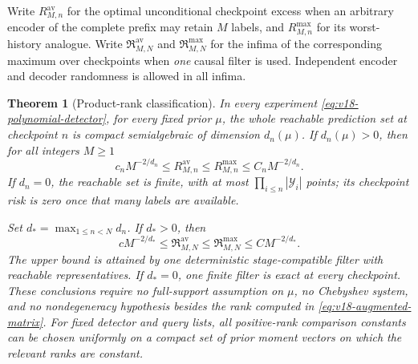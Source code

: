 \documentclass[11pt]{amsart}
\newtheorem{theorem}{Theorem}[section]
\theoremstyle{definition}\newtheorem{definition}[theorem]{Definition}
\theoremstyle{remark}\newtheorem{remark}[theorem]{Remark}
\begin{document}
Write $R^{\mathrm{av}}_{M,n}$ for the optimal unconditional checkpoint
excess when an arbitrary encoder of the complete prefix may retain
$M$ labels, and $R^{\mathrm{max}}_{M,n}$ for its worst-history analogue.
Write $\mathfrak R^{\mathrm{av}}_{M,N}$ and
$\mathfrak R^{\mathrm{max}}_{M,N}$ for the infima of the corresponding
maximum over checkpoints when \emph{one} causal filter is used.
Independent encoder and decoder randomness is allowed in all infima.

\begin{theorem}[Product-rank classification]\label{thm:v18-rank-classification}
In every experiment \eqref{eq:v18-polynomial-detector}, for every fixed
prior $\mu$, the whole reachable prediction set at checkpoint $n$ is
compact semialgebraic of dimension $d_n(\mu)$. If $d_n(\mu)>0$, then
for all integers $M\ge1$
\begin{equation}\label{eq:v18-checkpoint-rank-law}
 c_nM^{-2/d_n}\le R^{\mathrm{av}}_{M,n}
 \le R^{\mathrm{max}}_{M,n}\le C_nM^{-2/d_n}.
\end{equation}
If $d_n=0$, the reachable set is finite, with at most
$\prod_{i\le n}|\mathcal Y_i|$ points; its checkpoint risk is zero once
that many labels are available.

Set $d_* =\max_{1\le n<N}d_n$. If $d_*>0$, then
\begin{equation}\label{eq:v18-causal-rank-law}
 cM^{-2/d_*}\le\mathfrak R^{\mathrm{av}}_{M,N}
 \le\mathfrak R^{\mathrm{max}}_{M,N}\le CM^{-2/d_*}.
\end{equation}
The upper bound is attained by one deterministic stage-compatible
filter with reachable representatives. If $d_*=0$, one finite filter is
exact at every checkpoint. These conclusions require no full-support
assumption on $\mu$, no Chebyshev system, and no nondegeneracy
hypothesis besides the rank computed in \eqref{eq:v18-augmented-matrix}.
For fixed detector and query lists, all positive-rank comparison
constants can be chosen uniformly on a compact set of prior moment
vectors on which the relevant ranks are constant.
\end{theorem}
\end{document}
